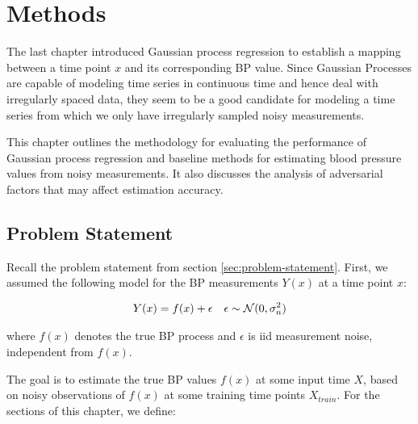 \chapter{Methods}\label{ch:methods}

The last chapter introduced Gaussian process regression to establish a mapping
between a time point $x$ and its corresponding BP value. Since Gaussian Processes
are capable of modeling time series in continuous time and hence deal with
irregularly spaced data, they seem to be a good candidate for modeling a time
series from which we only have irregularly sampled noisy measurements.

This chapter outlines the methodology for evaluating the performance of Gaussian
process regression and baseline methods for estimating blood pressure values from
noisy measurements. It also discusses the analysis of adversarial factors that may
affect estimation accuracy.





\section{Problem Statement}

Recall the problem statement from section \ref{sec:problem-statement}. First, we
assumed the following model for the BP measurements $Y(x)$ at a time point $x$:

\begin{align*}
    Y(x) = f(x) + \epsilon && \epsilon \sim \operatorname{\mathcal{N}}(0, \sigma_n^{2})
\end{align*}

where $f(x)$ denotes the true BP process and $\epsilon$ is iid measurement noise,
independent from $f(x)$.

The goal is to estimate the true BP values $f(x)$ at some input time $X$,
based on noisy observations of $f(x)$ at some training time points $X_{train}$.
For the sections of this chapter, we define:

